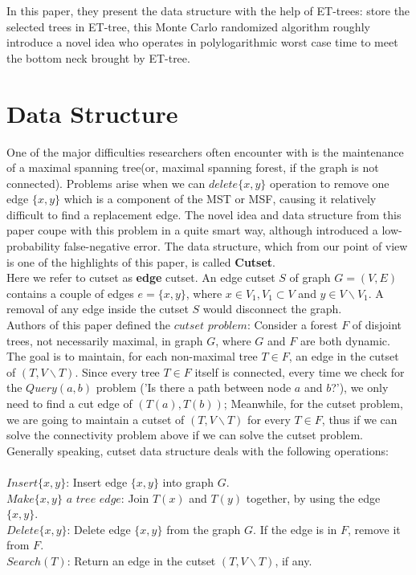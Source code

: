 \documentclass[conference,compsoc]{IEEEtran}
\begin{document}
In this paper, they present the data structure with the help of ET-trees: store the selected trees in ET-tree, this Monte Carlo randomized algorithm roughly introduce a novel idea who operates in polylogarithmic worst case time to meet the bottom neck brought by ET-tree.

\section{Data Structure}
One of the major difficulties researchers often encounter with is the maintenance of a maximal spanning tree(or, maximal spanning forest, if the graph is not connected). Problems arise when we can $delete\{x,y\}$ operation to remove one edge $\{x,y\}$ which is a component of the MST or MSF, causing it relatively difficult to find a replacement edge. The novel idea and data structure from this paper coupe with this problem in a quite smart way, although introduced a low-probability false-negative error. The data structure, which from our point of view is one of the highlights of this paper, is called \textbf{Cutset}. \\
Here we refer to cutset as \textbf{edge} cutset. An edge cutset $S$ of graph $G=(V,E)$ contains a couple of edges $e=\{x,y\}$, where $x \in V_1,V_1 \subset V $ and $y \in V \backslash V_1$. A removal of any edge inside the cutset $S$ would disconnect the graph. \\
Authors of this paper defined the $cutset$ $problem$: Consider a forest $F$ of disjoint trees, not necessarily maximal, in graph $G$, where $G$ and $F$ are both dynamic. The goal is to maintain, for each non-maximal tree $T\in F$, an edge in the cutset of $(T,V\backslash T)$. Since every tree $T\in F$ itself is connected, every time we check for the $Query(a,b)$ problem ('Is there a path between node $a$ and $b$?'), we only need to find a cut edge of $(T(a),T(b))$; Meanwhile, for the cutset problem, we are going to maintain a cutset of $(T,V\backslash T)$ for every $T \in F$, thus if we can solve the connectivity problem above if we can solve the cutset problem.\\
Generally speaking, cutset data structure deals with the following operations:\\\\
$Insert\{x,y\}$: Insert edge $\{x,y\}$ into graph $G$.\\
$Make \{x,y\}$ $a$ $tree$ $edge$: Join $T(x)$ and $T(y)$ together, by using the edge $\{x,y\}$.\\
$Delete\{x,y\}$: Delete edge $\{x,y\}$ from the graph $G$. If the edge is in $F$, remove it from $F$.\\
$Search(T)$: Return an edge in the cutset $(T,V\backslash T)$, if any.
\end{document}
